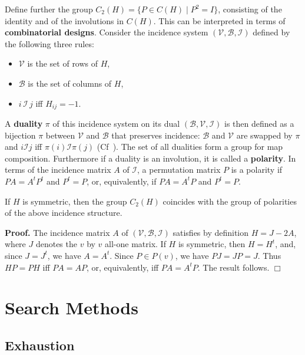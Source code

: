 \documentclass[12pt]{article}
\newenvironment{pf}{\noindent\textbf{Proof.}\quad}{\hfill{$\Box$}}
\begin{document}
Define further the group $C_2(H)=\{ P \in C(H) \mid P^2=I\}$, consisting of the identity and of the involutions in $C(H)$.
This can be interpreted in terms of {\bf combinatorial designs}.
Consider the incidence system $(\mathcal{V}, \mathcal{B}, \mathcal{I})$
defined by the following three rules:
\begin{itemize}
 \item $\mathcal{V}$ is the set of rows of
$H$,
 \item $\mathcal{B}$ is the set of columns of $H$,
 \item $i\, \mathcal{I} \, j$ iff $H_{ij}=-1$.
\end{itemize}




A {\bf duality} $\pi$ of this incidence system on its dual $(\mathcal{B}, \mathcal{V},  \mathcal{I})$ is then defined as a bijection $\pi$ between
$\mathcal{V}$ and $\mathcal{B}$ that
preserves incidence: $\mathcal{B}$ and $\mathcal{V}$ are swapped by $\pi$ and  $i \mathcal{I} j$ iff $\pi(i) \mathcal{I} \pi(j) $ (Cf~\cite[(4.1.b) p.\,34, Def.\,4.9]{BJH:99}).
The set of all dualities form a group for map composition. Furthermore if a duality is an involution, it is called  a  {\bf polarity}. In terms of the incidence matrix $A$ of $\mathcal{I}$,
a permutation matrix $P$ is a polarity if $PA=A^tP^t$ and $P^t=P$, or, equivalently, if $PA=A^tP$ and $P^t=P$.

{\thm If $H$ is symmetric, then the  group $C_2(H)$ coincides with the  group of polarities of the above incidence structure.}

\begin{pf} The incidence matrix $A$ of $(\mathcal{V}, \mathcal{B}, \mathcal{I})$ satisfies by definition $H=J-2A$, where $J$ denotes the $v$ by $v$ all-one matrix. If $H$ is symmetric, then $H=H^t$, and, since $J=J^t$, we have $A=A^t$.
 Since $P\in P(v)$, we have $PJ=JP=J$. Thus $HP=PH$ iff $PA=AP$, or, equivalently, iff $PA=A^tP$. The result follows.
\end{pf}




\section{Search Methods}
\label{sec:search}

\subsection{Exhaustion}
\end{document}

